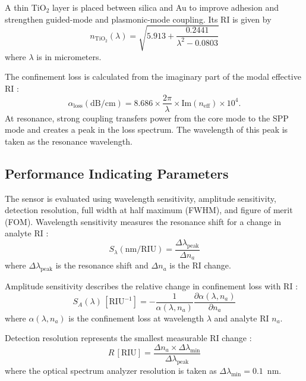 \documentclass[ACS,STIX2COL]{WileyNJD-v2}
\begin{document}
A thin TiO$_2$ layer is placed between silica and Au to improve adhesion and strengthen guided-mode and plasmonic-mode coupling. Its RI is given by \cite{ashrafian2025highly}
\begin{equation}
n_{\mathrm{TiO_2}}(\lambda)=
\sqrt{
5.913+\frac{0.2441}{\lambda^2-0.0803}
}
\label{eq:tio2_ri}
\end{equation}
where $\lambda$ is in micrometers.

The confinement loss is calculated from the imaginary part of the modal effective RI \cite{zhang2025highly}:
\begin{equation}
\alpha_{\mathrm{loss}}(\mathrm{dB/cm})=
8.686\times\frac{2\pi}{\lambda}
\times \mathrm{Im}(n_{\mathrm{eff}})\times 10^4 .
\label{eq:confinement_loss}
\end{equation}
At resonance, strong coupling transfers power from the core mode to the SPP mode and creates a peak in the loss spectrum. The wavelength of this peak is taken as the resonance wavelength.
\subsection{Performance Indicating Parameters}

The sensor is evaluated using wavelength sensitivity, amplitude sensitivity, detection resolution, full width at half maximum (FWHM), and figure of merit (FOM). Wavelength sensitivity measures the resonance shift for a change in analyte RI \cite{zhang2025highlys}:
\begin{equation}
S_{\lambda}(\mathrm{nm/RIU})=
\frac{\Delta\lambda_{\mathrm{peak}}}{\Delta n_a}
\label{eq:wavelength_sensitivity}
\end{equation}
where $\Delta\lambda_{\mathrm{peak}}$ is the resonance shift and $\Delta n_a$ is the RI change.

Amplitude sensitivity describes the relative change in confinement loss with RI \cite{ashrafian2025highly}:
\begin{equation}
S_A(\lambda)\,[\mathrm{RIU}^{-1}]
=
-\frac{1}{\alpha(\lambda,n_a)}
\frac{\partial \alpha(\lambda,n_a)}{\partial n_a}
\label{eq:amplitude_sensitivity}
\end{equation}
where $\alpha(\lambda,n_a)$ is the confinement loss at wavelength $\lambda$ and analyte RI $n_a$.

Detection resolution represents the smallest measurable RI change \cite{ashrafian2025highly}:
\begin{equation}
R\,[\mathrm{RIU}]
=
\frac{\Delta n_a \times \Delta\lambda_{\min}}
{\Delta\lambda_{\mathrm{peak}}}
\label{eq:resolution}
\end{equation}
where the optical spectrum analyzer resolution is taken as $\Delta\lambda_{\min}=0.1$~nm.
\end{document}
